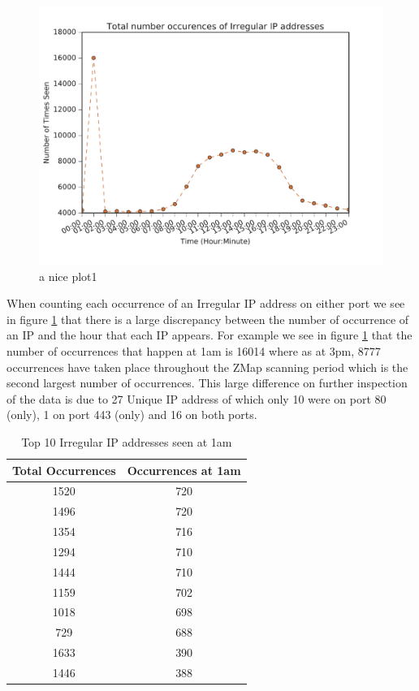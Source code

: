 \documentclass[a4wide,leqno,12pt]{report}
\begin{document}
\begin{figure}[H]
\centering
\includegraphics[scale=.5]{pdf_images/TotalNumberOccurencesOfIrregularIPaddressesOnAverage}
\caption{a nice plot1}
\label{fig:irreg_occurence}
\end{figure}
When counting each occurrence of an Irregular IP address on either port we see in figure \ref{fig:irreg_occurence} that there is a large discrepancy between the number of occurrence of an IP and the hour that each IP appears. For example we see in figure \ref{fig:irreg_occurence} that the number of occurrences that happen at 1am is 16014 where as at 3pm, 8777 occurrences have taken place throughout the ZMap scanning period which is the second largest number of occurrences. This large difference on further inspection of the data is due to 27 Unique IP address of which only 10 were on port 80 (only), 1 on port 443 (only) and 16 on both ports.



\begin{table}
\centering
\begin{tabular}{|| c c ||}
 \hline
  Total Occurrences & Occurrences at 1am  \\ [0.5ex]
 \hline\hline
 1520 & 720  \\
 1496 & 720 \\
 1354 & 716 \\
 1294 & 710  \\
 1444 & 710 \\
 1159 & 702 \\
 1018 & 698 \\
 729 & 688  \\
 1633 & 390 \\
 1446 & 388 \\[1ex]
 \hline
\end{tabular}
\caption{Top 10 Irregular IP addresses seen at 1am }
\label{table:2}
\end{table}
\end{document}
